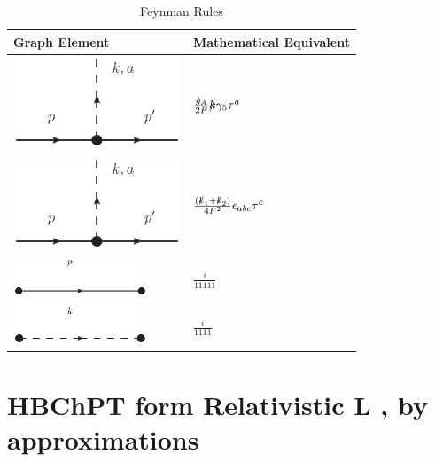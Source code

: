 \documentclass{article}
\begin{document}
\begin{table}
	[ht] \caption{Feynman Rules} 
	\vspace{5mm}
	\begin{tabular}{ M{5.5cm} M{5.5cm}}
		\hline 
		Graph Element & Mathematical Equivalent \\
		\hline
		\includegraphics[trim={7cm 23cm 7cm 2cm}, clip=true,width=
		5cm]{images/single_pion_vertex.eps} & $ \frac{\mathring{g}_{A}}{2F} \slashed k \gamma_{5}  \tau^{a}$   \\ %
		\includegraphics[trim={7cm 23cm 7cm 2cm}, clip=true,width=
		5cm]{images/single_pion_vertex.eps} & $ \frac{\left(\slashed k_1 +\slashed k_2 \right)}{4F^2}  \epsilon_{abc}  \tau^{c}$   \\ %
		\includegraphics[trim={7cm 23cm 7cm 2cm}, clip=true,width= 4cm]{images/baryon_propagator.eps} & $ \frac{i}{11111} $ \\
		\includegraphics[trim={7cm 23cm 7cm 2cm}, clip=true,width= 4cm]{images/meson_propargator.eps} & $ \frac{i}{1111} $ \\
		\hline
	\end{tabular}
\end{table}







\newpage
\section{HBChPT form Relativistic L , by approximations}
\end{document}
